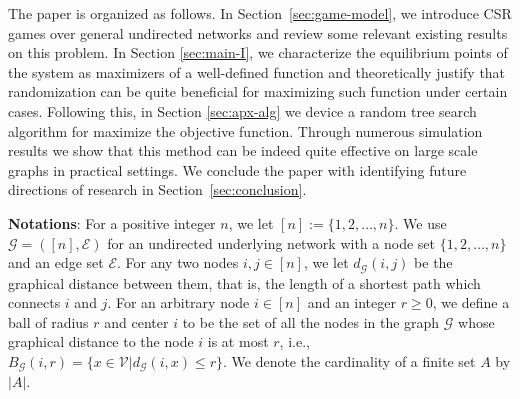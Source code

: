 The paper is organized as follows. In Section~\ref{sec:game-model}, we introduce CSR games over general undirected networks and review some relevant existing results on this problem. In Section \ref{sec:main-I}, we  characterize the equilibrium points of the system as maximizers of a well-defined function and theoretically justify that randomization can be quite beneficial for maximizing such function under certain cases. Following this, in Section \ref{sec:apx-alg} we device a random tree search algorithm for maximize the objective function. Through numerous simulation results we show that this method can be indeed quite effective on large scale graphs in practical settings. We conclude the paper with identifying future directions of research in Section~\ref{sec:conclusion}.

\textbf{Notations}:
For a positive integer $n$, we let $[n]:=\{1,2,\ldots,n\}$. We use $\mathcal{G}=([n], \mathcal{E})$ for an undirected underlying network with a node set $\{1,2,\ldots,n\}$ and an edge set $\mathcal{E}$. For any two nodes $i, j \in [n]$, we let $d_{\mathcal{G}}(i,j)$ be the graphical distance between them, that is, the length of a shortest path which connects $i$ and $j$. For an arbitrary node $i\in [n]$ and an integer $r\ge 0$, we define a ball of radius $r$ and center $i$ to be the set of all the nodes in the graph $\mathcal{G}$ whose graphical distance to the node $i$ is at most $r$, i.e., $B_{\mathcal{G}}(i,r)=\{x\in \mathcal{V}| d_{\mathcal{G}}(i,x)\leq r\}$. We denote the cardinality of a finite set $A$ by $|A|$.
